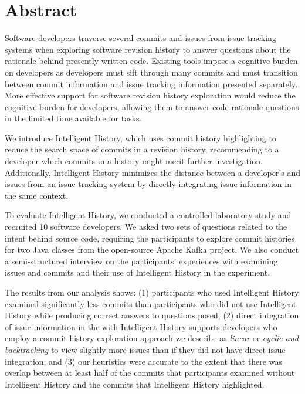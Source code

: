 
\chapter{Abstract}


Software developers traverse several commits and issues from issue tracking systems 
when exploring software revision history to answer questions about the rationale behind presently written code.
Existing tools impose a cognitive burden on developers as developers 
must sift through many commits and must transition between commit information 
and issue tracking information presented separately.
More effective support for software revision history exploration would 
reduce the cognitive burden for developers, allowing them to answer code 
rationale questions in the limited time available for tasks.

We introduce Intelligent History, which uses commit history highlighting to reduce the search space of 
commits in a revision history, recommending to a developer which commits in a history might merit further investigation.
Additionally, Intelligent History minimizes the distance between a developer's  and issues from an issue tracking system
by directly integrating issue information in the same context.

To evaluate Intelligent History, we conducted a controlled laboratory study and recruited 10 software developers.
We asked two sets of questions related to the intent behind source code, requiring the participants to explore 
commit histories for two Java classes from the open-source Apache Kafka project.
We also conduct a semi-structured interview on the participants' experiences with examining issues and commits 
and their use of Intelligent History in the experiment.

The results from our analysis shows:
(1) participants who used Intelligent History examined significantly
less commits than participants who did not use Intelligent History
while producing correct answers to questions posed;
(2) direct integration of issue information in the 
with Intelligent History supports developers who employ a commit history exploration approach
we describe as \textit{linear} or \textit{cyclic and backtracking} to view slightly more issues than if they did not have
direct issue integration; and
(3) our heuristics were accurate to the extent that there was overlap between at least half of the commits
that participants examined without Intelligent History and the commits that Intelligent History
highlighted.

